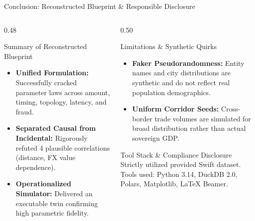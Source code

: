 \documentclass[aspectratio=169, 10pt]{beamer}
\begin{document}
\begin{frame}{Conclusion: Reconstructed Blueprint \& Responsible Disclosure}
\begin{columns}[T]
  \begin{column}{0.48\textwidth}
    \begin{block}{Summary of Reconstructed Blueprint}
      \footnotesize
      \begin{itemize}
        \item \textbf{Unified Formulation:} Successfully cracked parameter laws across amount, timing, topology, latency, and fraud.
        \item \textbf{Separated Causal from Incidental:} Rigorously refuted 4 plausible correlations (distance, FX value dependence).
        \item \textbf{Operationalized Simulator:} Delivered an executable twin confirming high parametric fidelity.
      \end{itemize}
    \end{block}
  \end{column}

  \begin{column}{0.50\textwidth}
    \begin{block}{Limitations \& Synthetic Quirks}
      \footnotesize
      \begin{itemize}
        \item \textbf{Faker Pseudorandomness:} Entity names and city distributions are synthetic and do not reflect real population demographics.
        \item \textbf{Uniform Corridor Seeds:} Cross-border trade volumes are simulated for broad distribution rather than actual sovereign GDP.
      \end{itemize}
    \end{block}

    \begin{exampleblock}{Tool Stack \& Compliance Disclosure}
      \footnotesize
      Strictly utilized provided Swift dataset. Tools used: Python 3.14, DuckDB 2.0, Polars, Matplotlib, LaTeX Beamer.
    \end{exampleblock}
  \end{column}
\end{columns}
\end{frame}
\end{document}

